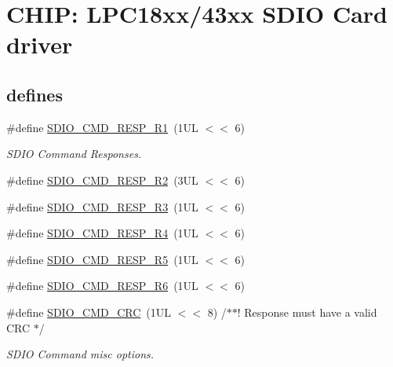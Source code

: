 \hypertarget{group___s_d_i_o__18_x_x__43_x_x}{}\section{C\+H\+IP\+: L\+P\+C18xx/43xx S\+D\+IO Card driver}
\label{group___s_d_i_o__18_x_x__43_x_x}
\subsection*{\textquotesingle{}defines\textquotesingle{}}
\begin{DoxyCompactItemize}
\item 
\#define \hyperlink{group___s_d_i_o__18_x_x__43_x_x_ga74936e4059fa646fdd3a62c68252e3bc}{S\+D\+I\+O\+\_\+\+C\+M\+D\+\_\+\+R\+E\+S\+P\+\_\+\+R1}~(1\+U\+L $<$$<$ 6)
\begin{DoxyCompactList}\small\item\em S\+D\+IO Command Responses. \end{DoxyCompactList}\item 
\#define \hyperlink{group___s_d_i_o__18_x_x__43_x_x_gae08429760806cb077de3a65bf22fc11a}{S\+D\+I\+O\+\_\+\+C\+M\+D\+\_\+\+R\+E\+S\+P\+\_\+\+R2}~(3\+U\+L $<$$<$ 6)
\item 
\#define \hyperlink{group___s_d_i_o__18_x_x__43_x_x_ga14bb18c3444739c3d43704fc8cb341e1}{S\+D\+I\+O\+\_\+\+C\+M\+D\+\_\+\+R\+E\+S\+P\+\_\+\+R3}~(1\+U\+L $<$$<$ 6)
\item 
\#define \hyperlink{group___s_d_i_o__18_x_x__43_x_x_ga16e699b4a068de39f712e5605e730260}{S\+D\+I\+O\+\_\+\+C\+M\+D\+\_\+\+R\+E\+S\+P\+\_\+\+R4}~(1\+U\+L $<$$<$ 6)
\item 
\#define \hyperlink{group___s_d_i_o__18_x_x__43_x_x_ga6fa4ac27f75edbdf59f840cecd675f9f}{S\+D\+I\+O\+\_\+\+C\+M\+D\+\_\+\+R\+E\+S\+P\+\_\+\+R5}~(1\+U\+L $<$$<$ 6)
\item 
\#define \hyperlink{group___s_d_i_o__18_x_x__43_x_x_ga935f51abdef49f44cde7c6978b829618}{S\+D\+I\+O\+\_\+\+C\+M\+D\+\_\+\+R\+E\+S\+P\+\_\+\+R6}~(1\+U\+L $<$$<$ 6)
\item 
\#define \hyperlink{group___s_d_i_o__18_x_x__43_x_x_ga7faeb5b3ae0de2806d36876b625cded6}{S\+D\+I\+O\+\_\+\+C\+M\+D\+\_\+\+C\+RC}~(1\+U\+L $<$$<$ 8)  /$\ast$$\ast$! Response must have a valid C\+R\+C $\ast$/
\begin{DoxyCompactList}\small\item\em S\+D\+IO Command misc options. \end{DoxyCompactList}\item 

\end{DoxyCompactItemize}
